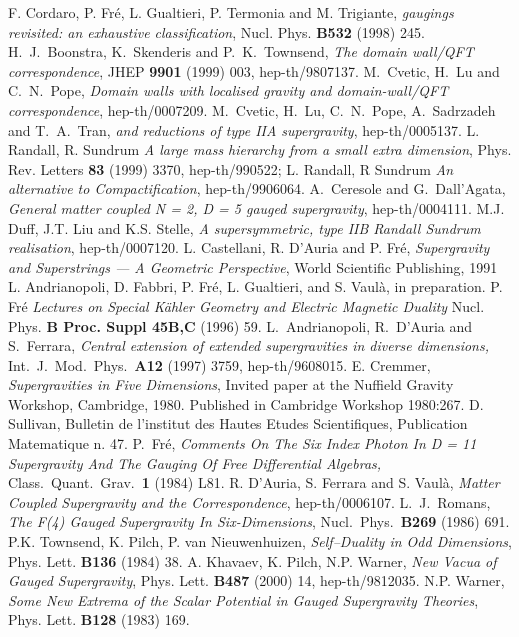 \documentclass[a4paper,12pt]{article}
\begin{document}
\begin{thebibliography}{50}
F. Cordaro, P. Fr\'e, L. Gualtieri, P. Termonia and M. Trigiante,
{\it {}\coordHE{} gaugings revisited: an exhaustive classification},
Nucl. Phys. {\bf B532} (1998) 245.
H.~J.~Boonstra, K.~Skenderis and P.~K.~Townsend, {\it The domain
wall/QFT correspondence}, JHEP {\bf 9901} (1999) 003,
hep-th/9807137.
M.~Cvetic, H.~Lu and C.~N.~Pope, {\it Domain walls with localised
gravity and domain-wall/QFT correspondence}, hep-th/0007209.
M.~Cvetic, H.~Lu, C.~N.~Pope, A.~Sadrzadeh and T.~A.~Tran, {\it
{}\coordHE{} and \coordHE{} reductions of type IIA supergravity},
hep-th/0005137.
 L. Randall, R. Sundrum
{\it A large mass hierarchy from a small extra dimension}, Phys.
Rev. Letters {\bf 83} (1999) 3370, hep-th/990522; L. Randall, R
Sundrum {\it An alternative to Compactification}, hep-th/9906064.
A.~Ceresole and G.~Dall'Agata, {\it General matter coupled N = 2,
D = 5 gauged supergravity}, hep-th/0004111.
 M.J. Duff, J.T. Liu and K.S. Stelle, {\it A supersymmetric,
type IIB Randall Sundrum realisation}, hep-th/0007120.
L. Castellani,  R. D'Auria and P. Fr\'e, {\it Supergravity and
Superstrings --- A Geometric Perspective}, World Scientific
Publishing, 1991
L. Andrianopoli, D. Fabbri, P. Fr\'e, L. Gualtieri, and S.
Vaul\`a, in preparation.
 P. Fr\'e {\it Lectures on Special K\"ahler
Geometry and Electric Magnetic Duality} Nucl. Phys. {\bf B Proc.
Suppl 45B,C} (1996) 59.
L.~Andrianopoli, R.~D'Auria and S.~Ferrara, {\it Central extension
of extended supergravities in diverse dimensions,} Int.\ J.\ Mod.\
Phys.\  {\bf A12} (1997) 3759, hep-th/9608015.
 E.
Cremmer, {\it Supergravities in Five Dimensions}, Invited paper at
the Nuffield Gravity Workshop, Cambridge, 1980. Published in
Cambridge Workshop 1980:267.
D. Sullivan, Bulletin de l'institut des Hautes Etudes
Scientifiques, Publication Matematique n. 47.
P.~Fr\'e, {\it Comments On The Six Index Photon In D = 11
Supergravity And The Gauging Of Free Differential Algebras,}
Class.\ Quant.\ Grav.\  {\bf 1} (1984) L81.
 R. D'Auria, S. Ferrara and S. Vaul\`a, {\it Matter Coupled \coordHE{}
Supergravity and the \myHighlight{$AdS_6/CFT_5$}\coordHE{} Correspondence},
hep-th/0006107.
L.~J.~Romans, {\it The F(4) Gauged Supergravity In
Six-Dimensions}, Nucl.\ Phys.\  {\bf B269} (1986) 691.
P.K. Townsend, K. Pilch, P. van Nieuwenhuizen, {\it Self--Duality
in Odd Dimensions}, Phys. Lett. {\bf B136} (1984) 38.
A. Khavaev, K. Pilch, N.P. Warner, {\it New Vacua of Gauged
\coordHE{} Supergravity}, Phys. Lett. {\bf B487} (2000) 14,
hep-th/9812035.
N.P. Warner, {\it Some New Extrema of the Scalar Potential in
Gauged
  Supergravity Theories}, Phys. Lett. {\bf B128} (1983) 169.
\end{thebibliography}
\end{document}

